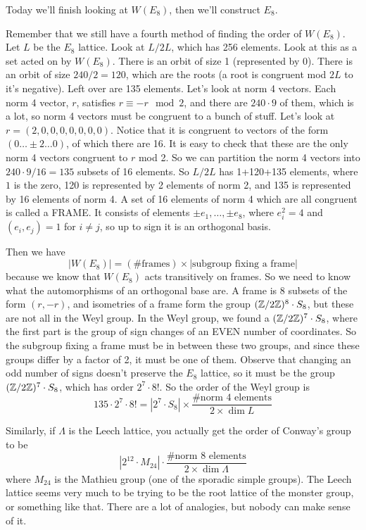  \setcounter{lecture}{26}

 Today we'll finish looking at $W(E_8)$, then we'll construct $E_8$.

 Remember that we still have a fourth method of finding the order of $W(E_8)$. Let $L$
 be the $E_8$ lattice. Look at $L/2L$, which has 256 elements. Look at this as a set
 acted on by $W(E_8)$. There is an orbit of size 1 (represented by 0). There is an
 orbit of size $240/2=120$, which are the roots (a root is congruent mod $2L$ to it's
 negative). Left over are 135 elements. Let's look at norm 4 vectors. Each norm 4
 vector, $r$, satisfies $r\equiv -r \mod 2$, and there are $240\cdot 9$ of them, which
 is a lot, so norm 4 vectors must be congruent to a bunch of stuff. Let's look at
 $r=(2,0,0,0,0,0,0,0)$. Notice that it is congruent to vectors of the form $(0\dots
 \pm 2\dots 0)$, of which there are 16. It is easy to check that these are the only
 norm 4 vectors congruent to $r$ mod 2. So we can partition the norm 4 vectors into
 $240\cdot 9/16=135$ subsets of 16 elements. So $L/2L$ has 1+120+135 elements, where
 $1$ is the zero, 120 is represented by 2 elements of norm 2, and 135 is represented
 by 16 elements of norm 4. A set of 16 elements of norm 4 which are all congruent is
 called a FRAME. It consists of elements $\pm e_1,\dots, \pm e_8$, where $e_i^2=4$ and
 $(e_i,e_j)=1$ for $i\neq j$, so up to sign it is an orthogonal basis.

 Then we have
 \[
    |W(E_8)| = (\text{\# frames})\times |\text{subgroup fixing a frame}|
 \]
 because we know that $W(E_8)$ acts transitively on frames. So we need to know what
 the automorphisms of an orthogonal base are. A frame is 8 subsets of the form
 $(r,-r)$, and isometries of a frame form the group $(\mathbb{Z}/2\mathbb{Z})^8\cdot S_8$, but these
 are not all in the Weyl group. In the Weyl group, we found a $(\mathbb{Z}/2\mathbb{Z})^7\cdot S_8$,
 where the first part is the group of sign changes of an EVEN number of coordinates.
 So the subgroup fixing a frame must be in between these two groups, and since these
 groups differ by a factor of 2, it must be one of them. Observe that changing an odd
 number of signs doesn't preserve the $E_8$ lattice, so it must be the group
 $(\mathbb{Z}/2\mathbb{Z})^7\cdot S_8$, which has order $2^7\cdot 8!$. So the order of the Weyl
 group is
 \[
    135\cdot 2^7\cdot 8! = |2^7\cdot S_8| \times \frac{\text{\# norm 4
    elements}}{2\times \dim L}
 \]
 \begin{remark}
 Similarly, if $\Lambda$ is the Leech lattice, you actually get the order of Conway's
 group to be
 \[
    |2^{12}\cdot M_{24}|\cdot \frac{\text{\# norm 8 elements}}{2\times \dim\Lambda}
 \]
 where $M_{24}$ is the Mathieu group (one of the sporadic simple groups). The Leech
 lattice seems very much to be trying to be the root lattice of the monster group, or
 something like that. There are a lot of analogies, but nobody can make sense of it.
 \end{remark}

